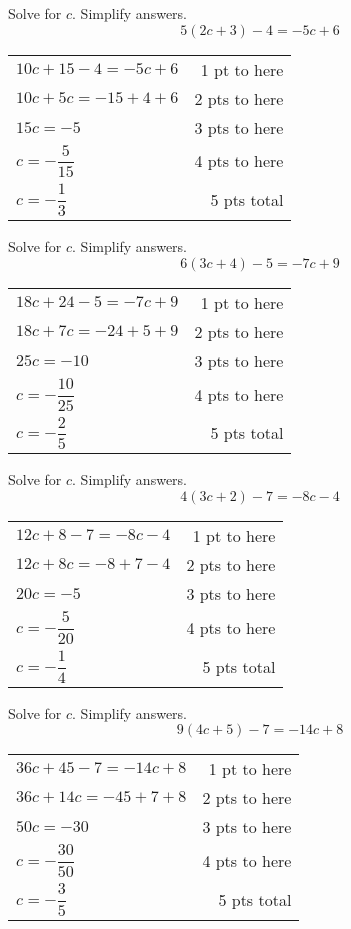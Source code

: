 {
	Solve for $c$. Simplify answers. $$5(2c+3)-4=-5c+6$$
}
{
	\begin{tabular}{l r}
	$10c+15-4=-5c+6$ & 1 pt to here\\
	$10c+5c=-15+4+6$ & 2 pts to here\\
	$15c=-5$ & 3 pts to here\\
	$c=-\dfrac{5}{15}$ & 4 pts to here\\
	$c=-\dfrac{1}{3}$ & 5 pts total\\
	\end{tabular}
}

{
	Solve for $c$. Simplify answers. $$6(3c+4)-5=-7c+9$$
}
{
	\begin{tabular}{l r}
	$18c+24-5=-7c+9$ & 1 pt to here\\
	$18c+7c=-24+5+9$ & 2 pts to here\\
	$25c=-10$ & 3 pts to here\\
	$c=-\dfrac{10}{25}$ & 4 pts to here\\
	$c=-\dfrac{2}{5}$ & 5 pts total\\
	\end{tabular}
}

{
	Solve for $c$. Simplify answers. $$4(3c+2)-7=-8c-4$$
}
{
	\begin{tabular}{l r}
	$12c+8-7=-8c-4$ & 1 pt to here\\
	$12c+8c=-8+7-4$ & 2 pts to here\\
	$20c=-5$ & 3 pts to here\\
	$c=-\dfrac{5}{20}$ & 4 pts to here\\
	$c=-\dfrac{1}{4}$ & 5 pts total\\
	\end{tabular}
}

{
	Solve for $c$. Simplify answers. $$9(4c+5)-7=-14c+8$$
}
{
	\begin{tabular}{l r}
	$36c+45-7=-14c+8$ & 1 pt to here\\
	$36c+14c=-45+7+8$ & 2 pts to here\\
	$50c=-30$ & 3 pts to here\\
	$c=-\dfrac{30}{50}$ & 4 pts to here\\
	$c=-\dfrac{3}{5}$ & 5 pts total\\
	\end{tabular}
}